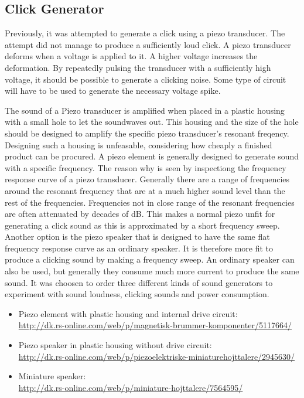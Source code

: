 \subsection{Click Generator} %
\label{sub:click_generator}
Previously, it was attempted to generate a click using a piezo transducer.
The attempt did not manage to produce a sufficiently loud click.
A piezo transducer deforms when a voltage is applied to it.
A higher voltage increases the deformation.
By repeatedly pulsing the transducer with a sufficiently high voltage, it should be possible to generate a clicking noise.
Some type of circuit will have to be used to generate the necessary voltage spike.

The sound of a Piezo transducer is amplified when placed in a plastic housing with a small hole to let the soundwaves out.
This housing and the size of the hole should be designed to amplify the specific piezo transducer's resonant freqency.
Designing such a housing is unfeasable, considering how cheaply a finished product can be procured.
A piezo element is generally designed to generate sound with a specific frequency.
The reason why is seen by inspectiong the frequency response curve of a piezo transducer.
Generally there are a range of frequencies around the resonant frequency that are at a much higher sound level than the rest of the frequencies.
Frequencies not in close range of the resonant frequencies are often attenuated by decades of dB.
This makes a normal piezo unfit for generating a click sound as this is approximated by a short frequency sweep.
Another option is the piezo speaker that is designed to have the same flat frequency response curve as an ordinary speaker.
It is therefore more fit to produce a clicking sound by making a frequency sweep.
An ordinary speaker can also be used, but generally they consume much more current to produce the same sound.
It was choosen to order three different kinds of sound generators to experiment with sound loudness, clicking sounds and power consumption.
\begin{itemize}
  \item Piezo element with plastic housing and internal drive circuit:\\
        \url{http://dk.rs-online.com/web/p/magnetisk-brummer-komponenter/5117664/}
  \item Piezo speaker in plastic housing without drive circuit: \\
        \url{http://dk.rs-online.com/web/p/piezoelektriske-miniaturehojttalere/2945630/}
  \item Miniature speaker:\\
          \url{http://dk.rs-online.com/web/p/miniature-hojttalere/7564595/}
\end{itemize}
